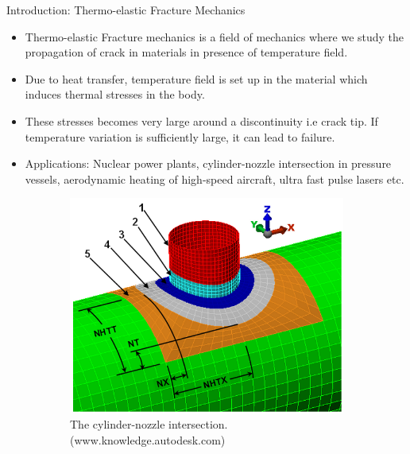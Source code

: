 \documentclass{beamer}
\begin{document}
\begin{frame}[t,fragile]{Introduction: Thermo-elastic Fracture Mechanics}
    \vspace{-.3cm}
    \footnotesize
    \begin{itemize}
        \item Thermo-elastic Fracture mechanics is a field of mechanics where we study the propagation of crack in materials in presence of temperature field.
        \item Due to heat transfer, temperature field is set up in the material which induces thermal stresses in the body. 
      \item These stresses becomes very large around a discontinuity i.e crack tip. If temperature variation is sufficiently large, it can lead to failure.
        \item Applications: Nuclear power plants, cylinder-nozzle
 intersection in pressure vessels, aerodynamic heating of high-speed aircraft, ultra fast pulse lasers etc.
   \end{itemize}
   \vspace{-.5cm}
\begin{figure}[H]
    \hspace{.7cm}
      \begin{subfigure}{0.45\textwidth}
    \centering
 \includegraphics[scale=.1]{cyl.png}
 \caption{\tiny{The cylinder-nozzle intersection. (www.knowledge.autodesk.com)}}
 \label{cyl}
 \end{subfigure}
\begin{subfigure}{0.45\textwidth}

\end{subfigure}
\end{figure}
\end{frame}
\end{document}
